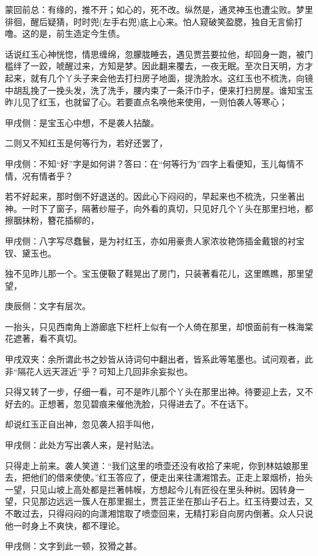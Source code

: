 \begin{parag}
    \begin{note}蒙回前总：有缘的，推不开；如心的，死不改。纵然是，通灵神玉也遭尘败。梦里徘徊，醒后疑猜，时时兜(左手右兜)底上心来。怕人窥破笑盈腮，独自无言偷打噜。这的是，前生造定今生债。\end{note}
\end{parag}


\begin{parag}
    话说红玉心神恍惚，情思缠绵，忽朦胧睡去，遇见贾芸要拉他，却回身一跑，被门槛绊了一跤，唬醒过来，方知是梦。因此翻来覆去，一夜无眠。至次日天明，方才起来，就有几个丫头子来会他去打扫房子地面，提洗脸水。这红玉也不梳洗，向镜中胡乱挽了一挽头发，洗了洗手，腰内束了一条汗巾子，便来打扫房屋。谁知宝玉昨儿见了红玉，也就留了心。若要直点名唤他来使用，一则怕袭人等寒心；\begin{note}甲戌侧：是宝玉心中想，不是袭人拈酸。\end{note}二则又不知红玉是何等行为，若好还罢了，\begin{note}甲戌侧：不知“好”字是如何讲？答曰：在“何等行为”四字上看便知，玉儿每情不情，况有情者乎？\end{note}若不好起来，那时倒不好退送的。因此心下闷闷的，早起来也不梳洗，只坐著出神。一时下了窗子，隔著纱屉子，向外看的真切，只见好几个丫头在那里扫地，都擦胭抹粉，簪花插柳的，\begin{note}甲戌侧：八字写尽蠢鬟，是为衬红玉，亦如用豪贵人家浓妆艳饰插金戴银的衬宝钗、黛玉也。\end{note}独不见昨儿那一个。宝玉便靸了鞋晃出了房门，只装著看花儿，这里瞧瞧，那里望望，\begin{note}庚辰侧：文字有层次。\end{note}一抬头，只见西南角上游廊底下栏杆上似有一个人倚在那里，却恨面前有一株海棠花遮著，看不真切。\begin{note}甲戌双夹：余所谓此书之妙皆从诗词句中翻出者，皆系此等笔墨也。试问观者，此非“隔花人远天涯近”乎？可知上几回非余妄拟也。\end{note}只得又转了一步，仔细一看，可不是昨儿那个丫头在那里出神。待要迎上去，又不好去的。正想著，忽见碧痕来催他洗脸，只得进去了。不在话下。
\end{parag}


\begin{parag}
    却说红玉正自出神，忽见袭人招手叫他，\begin{note}甲戌侧：此处方写出袭人来，是衬贴法。\end{note}只得走上前来。袭人笑道：“我们这里的喷壶还没有收拾了来呢，你到林姑娘那里去，把他们的借来使使。”红玉答应了，便走出来往潇湘馆去。正走上翠烟桥，抬头一望，只见山坡上高处都是拦著帏幙，方想起今儿有匠役在里头种树。因转身一望，只见那边远远一簇人在那里掘土，贾芸正坐在那山子石上。红玉待要过去，又不敢过去，只得闷闷的向潇湘馆取了喷壶回来，无精打彩自向房内倒著。众人只说他一时身上不爽快，都不理论。\begin{note}甲戌侧：文字到此一顿，狡猾之甚。\end{note}
\end{parag}


